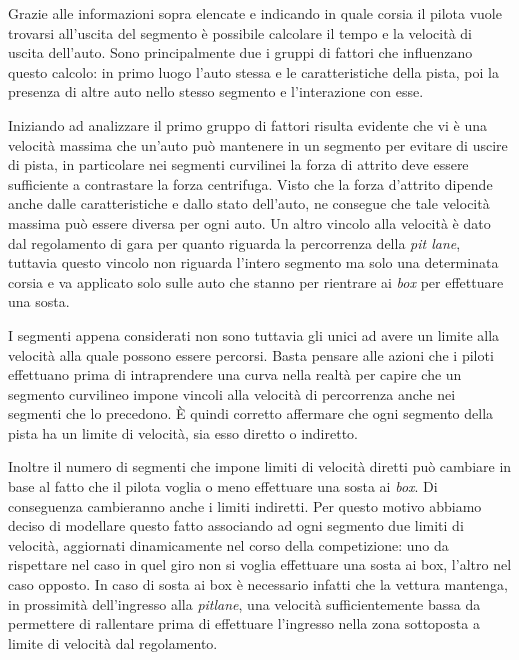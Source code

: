 Grazie alle informazioni sopra elencate e indicando in quale corsia il pilota vuole trovarsi all'uscita del segmento è possibile calcolare il tempo e la velocità di uscita dell'auto. Sono principalmente due i gruppi di fattori che influenzano questo calcolo: in primo luogo l'auto stessa e le caratteristiche della pista, poi la presenza di altre auto nello stesso segmento e l'interazione con esse.

Iniziando ad analizzare il primo gruppo di fattori risulta evidente che vi è una velocità massima che un'auto può mantenere in un segmento per evitare di uscire di pista, in particolare nei segmenti curvilinei la forza di attrito deve essere sufficiente a contrastare la forza centrifuga.
Visto che la forza d'attrito dipende anche dalle caratteristiche e dallo stato dell'auto, ne consegue che tale velocità massima può essere diversa per ogni auto.
Un altro vincolo alla velocità è dato dal regolamento di gara per quanto riguarda la percorrenza della \textit{pit lane}, tuttavia questo vincolo non riguarda l'intero segmento ma solo una determinata corsia e va applicato solo sulle auto che stanno per rientrare ai \textit{box} per effettuare una sosta.

I segmenti appena considerati non sono tuttavia gli unici ad avere un limite alla velocità alla quale possono essere percorsi. Basta pensare alle azioni che i piloti effettuano prima di intraprendere una curva nella realtà per capire che un segmento curvilineo impone vincoli alla velocità di percorrenza anche nei segmenti che lo precedono. \`E quindi corretto affermare che ogni segmento della pista ha un limite di velocità, sia esso diretto o indiretto.

Inoltre il numero di segmenti che impone limiti di velocità diretti può cambiare in base al fatto che il pilota voglia o meno effettuare una sosta ai \textit{box}. Di conseguenza cambieranno anche i limiti indiretti. Per questo motivo abbiamo deciso di modellare questo fatto associando ad ogni segmento due limiti di velocità, aggiornati dinamicamente nel corso della competizione: uno da rispettare nel caso in quel giro non si voglia effettuare una sosta ai box, l'altro nel caso opposto. In caso di sosta ai box è necessario infatti che la vettura mantenga, in prossimità dell'ingresso alla \textit{pitlane}, una velocità sufficientemente bassa da permettere di rallentare prima di effettuare l'ingresso nella zona sottoposta a limite di velocità dal regolamento.

